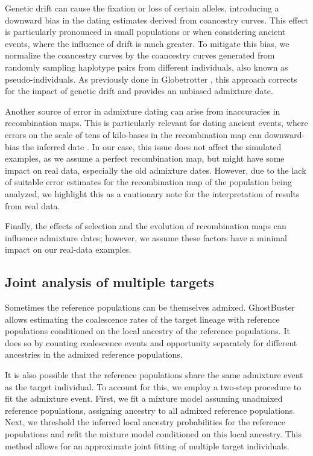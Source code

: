 Genetic drift can cause the fixation or loss of certain alleles, introducing a downward bias in the dating estimates derived from coancestry curves. This effect is particularly pronounced in small populations or when considering ancient events, where the influence of drift is much greater. To mitigate this bias, we normalize the coancestry curves by the coancestry curves generated from randomly sampling haplotype pairs from different individuals, also known as pseudo-individuals. As previously done in Globetrotter \cite{hellenthal2014genetic}, this approach corrects for the impact of genetic drift and provides an unbiased admixture date.

Another source of error in admixture dating can arise from inaccuracies in recombination maps. This is particularly relevant for dating ancient events, where errors on the scale of tens of kilo-bases in the recombination map can downward-bias the inferred date \cite{sankararaman2012date}. In our case, this issue does not affect the simulated examples, as we assume a perfect recombination map, but might have some impact on real data, especially the old admixture dates. However, due to the lack of suitable error estimates for the recombination map of the population being analyzed, we highlight this as a cautionary note for the interpretation of results from real data. %

Finally, the effects of selection and the evolution of recombination maps can influence admixture dates; however, we assume these factors have a minimal impact on our real-data examples.

\subsection{Joint analysis of multiple targets}
Sometimes the reference populations can be themselves admixed.
%
GhostBuster allows estimating the coalescence rates of the target lineage with reference populations conditioned on the local ancestry of the reference populations.
%
It does so by counting coalescence events and opportunity separately for different ancestries in the admixed reference populations.

It is also possible that the reference populations share the same admixture event as the target individual. To account for this, we employ a two-step procedure to fit the admixture event. First, we fit a mixture model assuming unadmixed reference populations, assigning ancestry to all admixed reference populations. Next, we threshold the inferred local ancestry probabilities for the reference populations and refit the mixture model conditioned on this local ancestry. This method allows for an approximate joint fitting of multiple target individuals.

